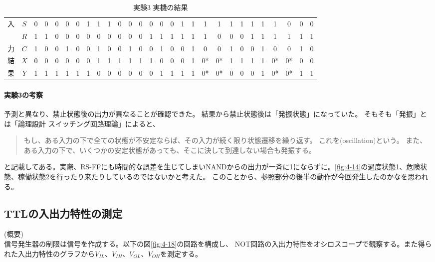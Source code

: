 \documentclass[dvipdfmx]{jsarticle}
\begin{document}
\begin{table}[H]
  \caption{実験3 実機の結果}
  \centering
  \begin{tabular}{|c|c|c|c|c|c|c|c|c|c|c|c|c|c|c|c|c|c|c|c|c|c|c|c|c|c|c|c|} \hline
     入 & $S$ & 0 & 0 & 0 & 0 & 0 & 1 & 1 & 1 & 0 & 0 & 0 & 0 & 0 & 0 & 1 & 1 & 1 & 1 & 1 & 1 & 1 & 1 & 1 & 0 & 0 & 0 \\ 
        & $R$ & 1 & 1 & 0 & 0 & 0 & 0 & 0 & 0 & 0 & 0 & 0 & 1 & 1 & 1 & 1 & 1 & 1 & 0 & 0 & 0 & 1 & 1 & 1 & 1 & 1 & 1 \\ 
     力 & $C$ & 1 & 0 & 0 & 1 & 0 & 0 & 1 & 0 & 0 & 1 & 0 & 0 & 1 & 0 & 0 & 1 & 0 & 0 & 1 & 0 & 0 & 1 & 0 & 0 & 1 & 0 \\ \hline\hline
     結 & $X$ & 0 & 0 & 0 & 0 & 0 & 0 & 1 & 1 & 1 & 1 & 1 & 1 & 0 & 0 & 0 & 1 & 0* & 0* & 1 & 1 & 1 & 1 & 0* & 0* & 0 & 0\\ 
     果 & $Y$ & 1 & 1 & 1 & 1 & 1 & 1 & 0 & 0 & 0 & 0 & 0 & 0 & 1 & 1 & 1 & 1 & 0* & 0* & 0 & 0 & 0 & 1 & 0* & 0* & 1 & 1\\ \hline
  \end{tabular}
  \label{tb:4-11}
\end{table}

\paragraph{実験3の考察}
\label{kousatu}
予測と異なり、禁止状態後の出力が異なることが確認できた。
結果から禁止状態後は「発振状態」になっていた。
そもそも「発振」とは「論理設計 スイッチング回路理論」\cite[p.140]{ronnrise}によると、
\begin{quote}
  もし、ある入力の下で全ての状態が不安定ならば、その入力が続く限り状態遷移を繰り返す。
  これを(oscillation)という。
  また、ある入力の下で、いくつかの安定状態があっても、そこに決して到達しない場合も発振する。
\end{quote}
と記載してある。実際、RS-FFにも時間的な誤差を生じてしまいNANDからの出力が一斉に1にならずに。\ref*{fig:4-14}の過度状態1、危険状態、稼働状態2を行ったり来たりしているのではないかと考えた。
このことから、参照部分の後半の動作が今回発生したのかなを思われる。

\subsection{TTLの入出力特性の測定}
(概要)\\
信号発生器の制限は信号を作成する。以下の図\ref*{fig:4-18}の回路を構成し、
NOT回路の入出力特性をオシロスコープで観察する。また得られた入出力特性のグラフから$V_{IL}$、$V_{IH}$、$V_{OL}$、$V_{OH}$を測定する。\\
\end{document}
